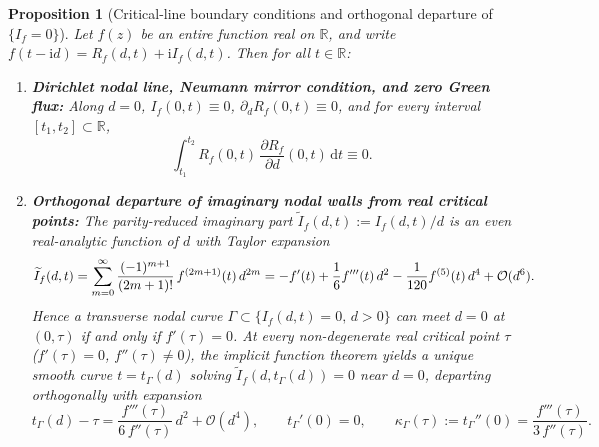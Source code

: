 \documentclass[11pt,a4paper,reqno]{amsart}
\newtheorem{proposition}[theorem]{Proposition}
\theoremstyle{definition}
\theoremstyle{remark}
\numberwithin{equation}{section}
\newcommand{\dd}{\mathrm{d}}
\newcommand{\ii}{\mathrm{i}}
\newcommand{\fac}{\mathclose{\mathchar"0021}}
\begin{document}
\begin{proposition}[Critical-line boundary conditions and orthogonal departure of $\{I_f = 0\}$]\label{prop:boundary_conditions}
Let $f(z)$ be an entire function real on $\mathbb{R}$, and write $f(t-\ii d) = R_f(d,t) + \ii I_f(d,t)$. Then for all $t \in \mathbb{R}$:
\begin{enumerate}
\item[\textup{(a)}] \textbf{Dirichlet nodal line, Neumann mirror condition, and zero Green flux:} Along $d = 0$, $I_f(0,t) \equiv 0$, $\partial_d R_f(0,t) \equiv 0$, and for every interval $[t_1, t_2] \subset \mathbb{R}$,
\begin{equation}\label{eq:green_flux}
\int_{t_1}^{t_2} R_f(0,t)\,\frac{\partial R_f}{\partial d}(0,t)\,\dd t \equiv 0.
\end{equation}
\item[\textup{(b)}] \textbf{Orthogonal departure of imaginary nodal walls from real critical points:} The parity-reduced imaginary part $\widetilde{I}_f(d,t) := I_f(d,t)/d$ is an even real-analytic function of $d$ with Taylor expansion
\begin{equation}\label{eq:Itil_maclaurin}
\widetilde{I}_f(d,t) = \sum_{m=0}^\infty \frac{(-1)^{m+1}}{(2m+1)\fac}\,f^{(2m+1)}(t)\,d^{2m}
= -f'(t) + \frac{1}{6}f'''(t)\,d^2 - \frac{1}{120}f^{(5)}(t)\,d^4 + \mathcal{O}(d^6).
\end{equation}
Hence a transverse nodal curve $\Gamma \subset \{I_f(d,t) = 0,\, d > 0\}$ can meet $d = 0$ at $(0,\tau)$ if and only if $f'(\tau) = 0$. At every non-degenerate real critical point $\tau$ ($f'(\tau) = 0$, $f''(\tau) \neq 0$), the implicit function theorem yields a unique smooth curve $t = t_\Gamma(d)$ solving $\widetilde{I}_f(d, t_\Gamma(d)) = 0$ near $d = 0$, departing orthogonally with expansion
\begin{equation}\label{eq:wall_curvature}
t_\Gamma(d) - \tau = \frac{f'''(\tau)}{6\,f''(\tau)}\,d^2 + \mathcal{O}(d^4), \qquad
t_\Gamma'(0) = 0, \qquad
\kappa_\Gamma(\tau) := t_\Gamma''(0) = \frac{f'''(\tau)}{3\,f''(\tau)}.
\end{equation}
\end{enumerate}
\end{proposition}
\end{document}
